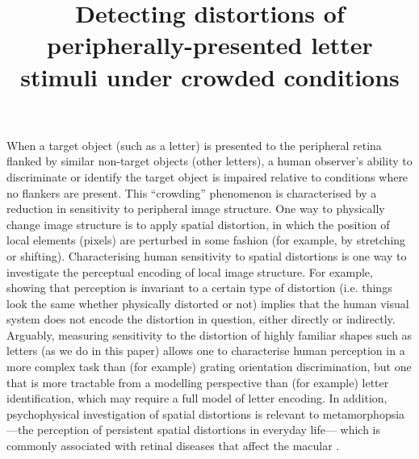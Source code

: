 \documentclass[doc, 11pt,a4paper,natbib]{apa6}\usepackage[]{graphicx}\usepackage[]{color}
\title{
Detecting distortions of peripherally-presented letter stimuli under crowded conditions
}
\begin{document}
\maketitle
\linenumbers



When a target object (such as a letter) is presented to the peripheral retina flanked by similar non-target objects (other letters), a human observer's ability to discriminate or identify the target object is impaired relative to conditions where no flankers are present.
This ``crowding'' phenomenon
\citep{andriessen_eccentric_1975,levi_vernier_1985,greenwood_positional_2009,
bouma_interaction_1970,parkes_compulsory_2001,toet_twodimensional_1992,strasburger_dancing_2014,
herzog_crowding_2015,harrison_unifying_2015}
is characterised by a reduction in sensitivity to peripheral image structure.
One way to physically change image structure is to apply spatial distortion, in which the position of local elements (pixels) are perturbed in some fashion (for example, by stretching or shifting).
Characterising human sensitivity to spatial distortions is one way to investigate the perceptual encoding of local image structure.
For example, showing that perception is invariant to a certain type of distortion (i.e. things look the same whether physically distorted or not) implies that the human visual system does not encode the distortion in question, either directly or indirectly.
Arguably, measuring sensitivity to the distortion of highly familiar shapes such as letters (as we do in this paper) allows one to characterise human perception in a more complex task than (for example) grating orientation discrimination, but one that is more tractable from a modelling perspective than (for example) letter identification, which may require a full model of letter encoding.
In addition, psychophysical investigation of spatial distortions is relevant to metamorphopsia---the perception of persistent spatial distortions in everyday life--- which is commonly associated with retinal diseases that affect the macular \citep{wiecek_metamorphopsia_2014}.
\end{document}

